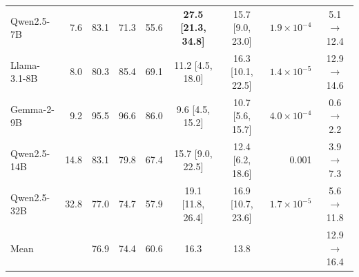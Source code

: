 \begin{table}[t]
{\begin{tabular}{@{}lrrrrccrc@{}}
Qwen2.5-7B & 7.6 & 83.1 & 71.3 & 55.6 & {\bf 27.5 {\scriptsize[21.3, 34.8]}} & 15.7 {\scriptsize[9.0, 23.0]} & $1.9{\times}10^{-4}$ & 5.1$\to$12.4 \\
Llama-3.1-8B & 8.0 & 80.3 & 85.4 & 69.1 & 11.2 {\scriptsize[4.5, 18.0]} & 16.3 {\scriptsize[10.1, 22.5]} & $1.4{\times}10^{-5}$ & 12.9$\to$14.6 \\
Gemma-2-9B & 9.2 & 95.5 & 96.6 & 86.0 & 9.6 {\scriptsize[4.5, 15.2]} & 10.7 {\scriptsize[5.6, 15.7]} & $4.0{\times}10^{-4}$ & 0.6$\to$2.2 \\
Qwen2.5-14B & 14.8 & 83.1 & 79.8 & 67.4 & 15.7 {\scriptsize[9.0, 22.5]} & 12.4 {\scriptsize[6.2, 18.6]} & 0.001 & 3.9$\to$7.3 \\
Qwen2.5-32B & 32.8 & 77.0 & 74.7 & 57.9 & 19.1 {\scriptsize[11.8, 26.4]} & 16.9 {\scriptsize[10.7, 23.6]} & $1.7{\times}10^{-5}$ & 5.6$\to$11.8 \\
\midrule
Mean &  & 76.9 & 74.4 & 60.6 & 16.3 & 13.8 &  & 12.9$\to$16.4 \\
\bottomrule
\end{tabular}}
\end{table}
